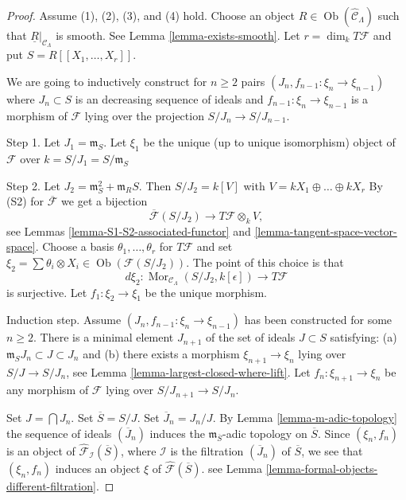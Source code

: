 \documentclass{stacks-project}
\theoremstyle{plain}
\theoremstyle{definition}
\theoremstyle{remark}
\numberwithin{equation}{subsection}
\def\Mor{\mathop{\mathrm{Mor}}\nolimits}
\def\Ob{\mathop{\mathrm{Ob}}\nolimits}
\begin{document}
\begin{proof}
Assume (1), (2), (3), and (4) hold. Choose an object
$R \in \Ob(\widehat{\mathcal{C}}_\Lambda)$
such that $\underline{R}|_{\mathcal{C}_\Lambda}$ is smooth.
See Lemma \ref{lemma-exists-smooth}.
Let $r = \dim_k T\mathcal{F}$ and put $S = R[[X_1, \ldots, X_r]]$.

\medskip\noindent
We are going to inductively construct for $n \geq 2$ pairs
$(J_n, f_{n - 1} : \xi_n \to \xi_{n - 1})$
where $J_n \subset S$ is an decreasing sequence of ideals and
$f_{n - 1} : \xi_n \to \xi_{n - 1}$ is a morphism of
$\mathcal{F}$ lying over the projection $S/J_n \to S/J_{n - 1}$.

\medskip\noindent
Step 1. Let $J_1 = \mathfrak m_S$. Let $\xi_1$ be the unique
(up to unique isomorphism) object of $\mathcal{F}$ over
$k = S/J_1 = S/\mathfrak m_S$

\medskip\noindent
Step 2. Let
$J_2 = \mathfrak m_S^2 + \mathfrak{m}_R S$. Then
$S/J_2 = k[V]$ with $V = kX_1 \oplus \ldots \oplus kX_r$
By (S2) for $\overline{\mathcal{F}}$ we get a bijection
$$
\overline{\mathcal{F}}(S/J_2)
\longrightarrow
T\mathcal{F} \otimes_k V,
$$
see
Lemmas \ref{lemma-S1-S2-associated-functor} and
\ref{lemma-tangent-space-vector-space}.
Choose a basis $\theta_1, \ldots, \theta_r$ for $T\mathcal{F}$ and set
$\xi_2 = \sum \theta_i \otimes X_i \in \Ob(\mathcal{F}(S/J_2))$.
The point of this choice is that
$$
d\xi_2 :
\Mor_{\mathcal{C}_\Lambda}(S/J_2, k[\epsilon])
\longrightarrow
T\mathcal{F}
$$
is surjective. Let $f_1 : \xi_2 \to \xi_1$ be the unique morphism.

\medskip\noindent
Induction step. Assume $(J_n, f_{n - 1} : \xi_n \to \xi_{n - 1})$ has been
constructed for some $n \geq 2$. There is a minimal element $J_{n + 1}$ of
the set of ideals $J \subset S$ satisfying:
(a) $\mathfrak m_S J_n \subset J \subset J_n$ and
(b) there exists a morphism $\xi_{n + 1} \to \xi_n$ lying over
$S/J \to S/J_n$, see
Lemma \ref{lemma-largest-closed-where-lift}.
Let $f_n : \xi_{n + 1} \to \xi_n$ be any morphism of $\mathcal{F}$
lying over $S/J_{n + 1} \to S/J_n$.

\medskip\noindent
Set $J = \bigcap J_n$. Set $\overline{S} = S/J$. Set $\overline{J}_n = J_n/J$.
By
Lemma \ref{lemma-m-adic-topology}
the sequence of ideals $(\overline{J}_n)$ induces the
$\mathfrak m_{\overline{S}}$-adic topology on $\overline{S}$.
Since $(\xi_n, f_n)$ is an object of
$\widehat{\mathcal{F}}_\mathcal{I}(\overline{S})$, where $\mathcal{I}$
is the filtration $(\overline{J}_n)$ of $\overline{S}$,
we see that $(\xi_n, f_n)$
induces an object $\xi$ of $\widehat{\mathcal{F}}(\overline{S})$.
see
Lemma \ref{lemma-formal-objects-different-filtration}.


\end{proof}
\end{document}
